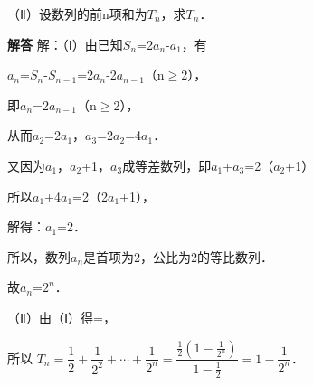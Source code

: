 （Ⅱ）设数列的前n项和为\ensuremath{T_{n}}，求\ensuremath{T_{n}}．\par
\QuestionSpace{4.8cm}
\ifshowanswers
\par\begingroup\color{solutioncolor}\noindent\textbf{解答}\quad
解：（Ⅰ）由已知\ensuremath{S_{n}}=2\ensuremath{a_{n}}-\ensuremath{a_{1}}，有\par
\ensuremath{a_{n}}=\ensuremath{S_{n}}-\ensuremath{S_{n-1}}=2\ensuremath{a_{n}}-2\ensuremath{a_{n-1}}（n\ensuremath{\ge}2），\par
即\ensuremath{a_{n}}=2\ensuremath{a_{n-1}}（n\ensuremath{\ge}2），\par
从而\ensuremath{a_{2}}=2\ensuremath{a_{1}}，\ensuremath{a_{3}}=2\ensuremath{a_{2}}=4\ensuremath{a_{1}}．\par
又因为\ensuremath{a_{1}}，\ensuremath{a_{2}}+1，\ensuremath{a_{3}}成等差数列，即\ensuremath{a_{1}}+\ensuremath{a_{3}}=2（\ensuremath{a_{2}}+1）\par
所以\ensuremath{a_{1}}+4\ensuremath{a_{1}}=2（2\ensuremath{a_{1}}+1），\par
解得：\ensuremath{a_{1}}=2．\par
所以，数列{\ensuremath{a_{n}}}是首项为2，公比为2的等比数列．\par
故\ensuremath{a_{n}}=\ensuremath{2^{n}}．\par
（Ⅱ）由（Ⅰ）得=，\par
所以 $T_n=\dfrac12+\dfrac1{2^2}+\cdots+\dfrac1{2^n}=\dfrac{\frac12\left(1-\frac1{2^n}\right)}{1-\frac12}=1-\dfrac1{2^n}$．\par
\par\endgroup\fi

